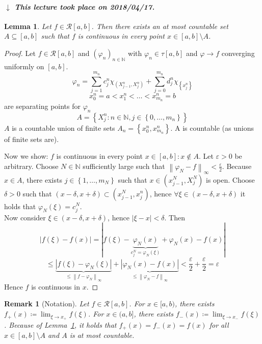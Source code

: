 \documentclass{article}
\newtheorem{lemma}{Lemma}  \numberwithin{lemma}{section}
\newtheorem{remark}{Remark}  \numberwithin{remark}{section}
\newcommand{\set}[1]{\left\{#1\right\}}
\newcommand{\norm}[1]{\left\|#1\right\|}
\newcommand{\card}[1]{\left|#1\right|}
\newcommand{\dateref}[1]{%
  \begin{mdframed}[backgroundcolor=gray!10,innerbottommargin=0pt,innertopmargin=0pt]
    \paragraph{\textit{$\downarrow$ This lecture took place on #1.}}%
  \end{mdframed}%
}
\begin{document}
\dateref{2018/04/17}

\begin{lemma} %
  \label{lemma9}
  Let $f \in \mathcal R[a,b]$. Then there exists an at most countable set $A \subseteq [a,b]$ such that $f$ is continuous in every point $x \in [a,b] \setminus A$.
\end{lemma}
\begin{proof}
  Let $f \in \mathcal R[a,b]$ and $(\varphi_n)_{n \in \mathbb N}$ with $\varphi_n \in \tau[a,b]$ and $\varphi \to f$ converging uniformly on $[a,b]$.
  \[ \varphi_n = \sum_{j=1}^{m_n} c_j^n \chi_{(X_{j-1}^n, X_j^n)} + \sum_{j=0}^{m_n} d_j^n \chi_{\set{x_j^n}} \]
  \[ x_0^n = a < x_1^n < \ldots < x_{m_n}^n = b \]
  are separating points for $\varphi_n$
  \[ A = \set{X_j^n: n \in \mathbb N, j \in \set{0, \ldots, m_n}} \]
  $A$ is a countable union of finite sets $A_n = \set{x_0^n, x_{m_n}^n}$. A is countable (as unions of finite sets are).

  Now we show: $f$ is continuous in every point $x \in [a,b]: x \not\in A$.
  Let $\varepsilon > 0$ be arbitrary. Choose $N \in \mathbb N$ sufficiently large such that $\norm{\varphi_N - f}_{\infty} < \frac\varepsilon2$. Because $x \in A$, there exists $j \in \set{1, \ldots, m_N}$ such that $x \in (x_{j-1}^N, X_j^N)$ is open.
  Choose $\delta > 0$ such that $(x - \delta, x + \delta) \subset (x_{j-1}^N, x_j^n)$, hence $\forall \xi \in (x - \delta, x + \delta)$ it holds that $\varphi_N(\xi) = c_j^N$. \\
  Now consider $\xi \in (x - \delta, x + \delta)$, hence $\card{\xi - x} < \delta$. Then
  \[ \card{f(\xi) - f(x)} = \card{f(\xi) - \underbrace{\varphi_N(x)}_{c_j^N = \varphi_N(\xi)} + \varphi_N(x) - f(x)} \]
  \[ \leq \underbrace{\card{f(\xi) - \varphi_N(\xi)}}_{\leq \norm{f - \varphi_N}_{\infty}} + \underbrace{\card{\varphi_N(x) - f(x)}}_{\leq \norm{\varphi_N - f}_{\infty}} < \frac\varepsilon2 + \frac\varepsilon2 = \varepsilon \]
  Hence $f$ is continuous in $x$.
\end{proof}

\begin{remark}[Notation]
  Let $f \in \mathcal R[a,b]$. For $x \in [a,b)$, there exists $f_+(x) \coloneqq \lim_{\xi \to x_+} f(\xi)$.
  For $x \in (a,b]$, there exists $f_-(x) \coloneqq \lim_{\xi \to x_-} f(\xi)$.
  Because of Lemma~\ref{lemma9}, it holds that $f_+(x) = f_-(x) = f(x)$ for all $x \in [a,b] \setminus A$ and $A$ is at most countable.
\end{remark}
\end{document}
